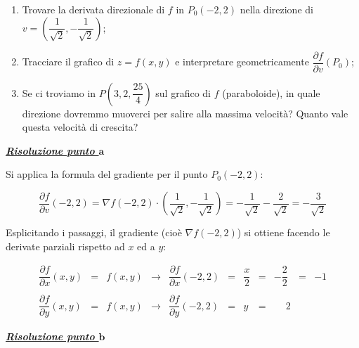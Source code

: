 \documentclass[a4paper]{article}
\begin{document}
	\begin{enumerate}[label=\alph*)]
		\item Trovare la derivata direzionale di $f$ in $P_{0}\left(-2,2\right)$ nella direzione di $v = \left(\dfrac{1}{\sqrt{2}}, -\dfrac{1}{\sqrt{2}}\right)$;
		
		\item Tracciare il grafico di $z = f\left(x,y\right)$ e interpretare geometricamente $\dfrac{\partial f}{\partial v}\left(P_{0}\right)$;
		
		\item Se ci troviamo in $P\left(3,2,\dfrac{25}{4}\right)$ sul grafico di $f$ (paraboloide), in quale direzione dovremmo muoverci per salire alla massima velocità? Quanto vale questa velocità di crescita?
	\end{enumerate}

	\noindent
	\textcolor{Green4}{\textbf{\emph{\underline{Risoluzione punto $\boldsymbol{a}$}}}}\newline
	
	\noindent
	Si applica la formula del gradiente per il punto $P_{0}\left(-2,2\right)$:
	
	\begin{equation*}
		\dfrac{\partial f}{\partial v}\left(-2,2\right) = \nabla f\left(-2,2\right) \cdot \left(\dfrac{1}{\sqrt{2}}, -\dfrac{1}{\sqrt{2}}\right) = -\dfrac{1}{\sqrt{2}} - \dfrac{2}{\sqrt{2}} = -\dfrac{3}{\sqrt{2}}
	\end{equation*}

	\noindent
	Esplicitando i passaggi, il gradiente (cioè $\nabla f\left(-2,2\right)$) si ottiene facendo le derivate parziali rispetto ad $x$ ed a $y$:
	
	\begin{equation*}
		\begin{array}{lllllllllll}
			\dfrac{\partial f}{\partial x}\left(x,y\right) & = & f\left(x,y\right) & \rightarrow & \dfrac{\partial f}{\partial x}\left(-2,2\right) & = & \dfrac{x}{2} & = & -\dfrac{2}{2} & = & -1 \\
			&&&&&&&&&& \\
			\dfrac{\partial f}{\partial y}\left(x,y\right) & = & f\left(x,y\right) & \rightarrow & \dfrac{\partial f}{\partial y}\left(-2,2\right) & = & y			   & = & \phantom{-}2 &&
		\end{array}
	\end{equation*}

	\noindent
	\textcolor{Green4}{\textbf{\emph{\underline{Risoluzione punto $\boldsymbol{b}$}}}}\newline
	
\end{document}
